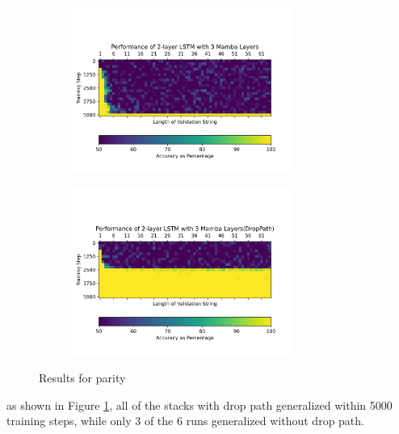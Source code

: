 \begin{figure}
\begin{subfigure}{0.5\textwidth}
\begin{center}
        \includegraphics[width=0.8\textwidth]{figures/parity_lstm_False_5_2.png}
        \end{center}
    \end{subfigure}\begin{subfigure}{0.5\textwidth}
        \begin{center}
        \includegraphics[width=0.8\textwidth]{figures/parity_lstm_True_5_2.png}
        \end{center}
    \end{subfigure}
    \caption{Results for parity}
    \label{droppathresults}
\end{figure}
as shown in Figure \ref{droppathresults}, all of the stacks with drop path
generalized within 5000 training steps, while only 3 of the 6 runs generalized
without drop path.

